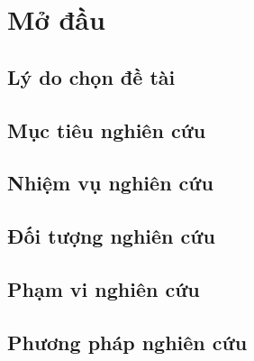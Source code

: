 \chapter*{Mở đầu}

\renewcommand*{\thesection}{\arabic{section}}
\renewcommand*{\thesubsection}{\alph{subsection}}

\section{Lý do chọn đề tài}

\section{Mục tiêu nghiên cứu}

\section{Nhiệm vụ nghiên cứu}

\section{Đối tượng nghiên cứu}

\section{Phạm vi nghiên cứu}

\section{Phương pháp nghiên cứu}

\renewcommand*{\thesection}{\arabic{chapter}.\arabic{section}}
\renewcommand*{\thesubsection}{\arabic{chapter}.\arabic{section}.\arabic{subsection}}
